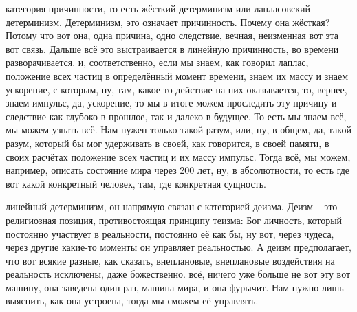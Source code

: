 категория причинности, то есть жёсткий детерминизм
или лапласовский детерминизм. Детерминизм, это означает
причинность. Почему она жёсткая? Потому что вот она, одна причина, одно
следствие, вечная, неизменная вот эта вот связь. Дальше всё это выстраивается в
линейную причинность, во времени разворачивается. и, соответственно, если мы
знаем, как говорил лаплас, положение всех частиц в определённый момент времени,
знаем их массу и знаем ускорение, с которым, ну, там, какое-то действие на них
оказывается, то, вернее, знаем импульс, да, ускорение, то мы в итоге можем
проследить эту причину и следствие как глубоко в прошлое, так и далеко в
будущее. То есть мы знаем всё, мы можем узнать всё. Нам нужен только такой
разум, или, ну, в общем, да, такой разум, который бы мог удерживать в своей, как
говорится, в своей памяти, в своих расчётах положение всех частиц и их массу
импульс. Тогда всё, мы можем, например, описать состояние мира через 200 лет,
ну, в абсолютности, то есть где вот какой конкретный человек, там, где
конкретная сущность. 


линейный детерминизм, он напрямую
связан с категорией деизма. Деизм – это религиозная позиция, противостоящая  принципу теизма: Бог личность, который постоянно участвует в реальности,
постоянно её как бы, ну вот, через чудеса, через другие какие-то моменты он
управляет реальностью. 
А деизм предполагает, что вот всякие разные, как сказать,
внеплановые, внеплановые воздействия на реальность исключены, даже божественно.
всё, ничего уже больше не вот эту вот машину, она заведена один раз, машина
мира, и она фурычит. Нам нужно лишь выяснить, как она устроена, тогда мы сможем
её управлять. 

